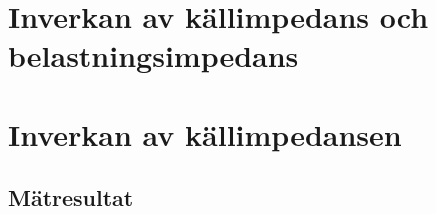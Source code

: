 %
%

\section{Inverkan av källimpedans och belastningsimpedans}\label{impedans}
% 

\section{Inverkan av källimpedansen}\label{Zin}



\subsection{Mätresultat}\label{}

